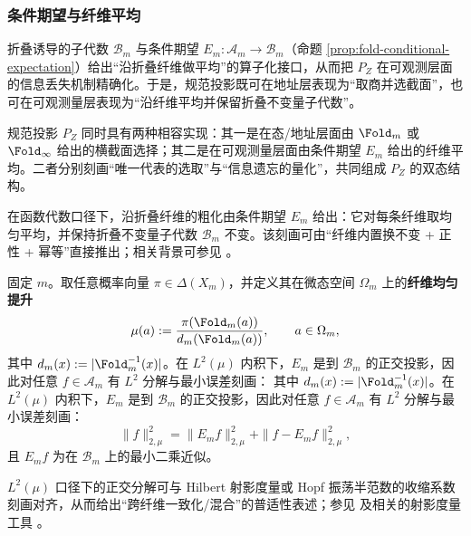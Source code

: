 \subsubsection{条件期望与纤维平均}\label{subsec:pom-conditional-expectation}
折叠诱导的子代数 $\mathcal{B}_m$ 与条件期望 $E_m:\mathcal{A}_m\to\mathcal{B}_m$（命题 \ref{prop:fold-conditional-expectation}）给出“沿折叠纤维做平均”的算子化接口，从而把 \(P_Z\) 在可观测层面的信息丢失机制精确化。于是，规范投影既可在地址层表现为“取商并选截面”，也可在可观测量层表现为“沿纤维平均并保留折叠不变量子代数”。

\begin{remark}[规范投影的双态]\label{rem:pom-pz-dual}
规范投影 $P_Z$ 同时具有两种相容实现：其一是在态/地址层面由 $\Fold_m$ 或 $\Fold_\infty$ 给出的横截面选择；其二是在可观测量层面由条件期望 $E_m$ 给出的纤维平均。二者分别刻画“唯一代表的选取”与“信息遗忘的量化”，共同组成 $P_Z$ 的双态结构。
\end{remark}

在函数代数口径下，沿折叠纤维的粗化由条件期望 $E_m$ 给出：它对每条纤维取均匀平均，并保持折叠不变量子代数 $\mathcal{B}_m$ 不变。该刻画可由“纤维内置换不变 + 正性 + 幂等”直接推出；相关背景可参见 \cite{WaltersErgodicTheory}。

固定 $m$。取任意概率向量 $\pi\in\Delta(X_m)$，并定义其在微态空间 $\Omega_m$ 上的\textbf{纤维均匀提升}
\begin{equation}
\label{eq:pom-fiber-uniform-lift}
\mu(a):=\frac{\pi(\Fold_m(a))}{d_m(\Fold_m(a))},\qquad a\in\Omega_m,
\end{equation}
其中 $d_m(x):=|\Fold_m^{-1}(x)|$。在 $L^2(\mu)$ 内积下，$E_m$ 是到 $\mathcal{B}_m$ 的正交投影，因此对任意 $f\in\mathcal{A}_m$ 有 $L^2$ 分解与最小误差刻画：
其中 $d_m(x):=|\Fold_m^{-1}(x)|$。在 $L^2(\mu)$ 内积下，$E_m$ 是到 $\mathcal{B}_m$ 的正交投影，因此对任意 $f\in\mathcal{A}_m$ 有 $L^2$ 分解与最小误差刻画：
\begin{equation}
\label{eq:pom-L2-pythagoras}
\|f\|_{2,\mu}^2=\|E_m f\|_{2,\mu}^2+\|f-E_m f\|_{2,\mu}^2,
\end{equation}
且 $E_m f$ 为在 $\mathcal{B}_m$ 上的最小二乘近似。

\begin{remark}[与射影度量收缩口径的对齐]\label{rem:pom-fold-projective-metric}
$L^2(\mu)$ 口径下的正交分解可与 Hilbert 射影度量或 Hopf 振荡半范数的收缩系数刻画对齐，从而给出“跨纤维一致化/混合”的普适性表述；参见 \cite{GaubertQu2015DobrushinCones} 及相关的射影度量工具 \cite{ReebKastoryanoWolf2011HilbertProjectiveQuantum}。
\end{remark}

